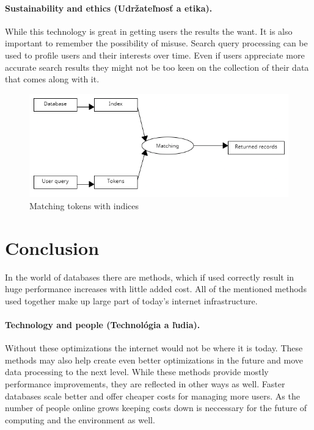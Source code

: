 \documentclass[10pt,twoside,a4paper]{article}
\begin{document}
\paragraph{Sustainability and ethics (Udržateľnosť a etika).}
While this technology is great in getting users the results the want. It is also important to remember the possibility of misuse. Search query processing can be used to profile users and their interests over time. Even if users appreciate more accurate search results they might not be too keen on the collection of their data that comes along with it.

\begin{figure}[h]
    \centering
    \includegraphics[width=1\linewidth]{Matching-query.png}
    \caption{Matching tokens with indices}
    \label{fig:matching-query}
\end{figure}

\section{Conclusion}
In the world of databases there are methods, which if used correctly result in huge performance increases with little added cost. All of the mentioned methods used together make up large part of today's internet infrastructure.\paragraph{Technology and people (Technológia a ľudia).}Without these optimizations the internet would not be where it is today. These methods may also help create even better optimizations in the future and move data processing to the next level. While these methods provide mostly performance improvements, they are reflected in other ways as well. Faster databases scale better and offer cheaper costs for managing more users. As the number of people online grows keeping costs down is neccessary for the future of computing and the environment as well.



\end{document}
